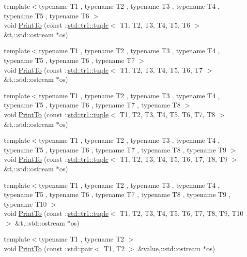 \begin{DoxyCompactItemize}
{\footnotesize template$<$typename T1 , typename T2 , typename T3 , typename T4 , typename T5 , typename T6 $>$ }\\void \hyperlink{namespacetesting_1_1internal_a205f62732d75b884f0668eb4483b2a58}{\-Print\-To} (const \-::\hyperlink{classstd_1_1tr1_1_1tuple}{std\-::tr1\-::tuple}$<$ \-T1, \-T2, \-T3, \-T4, \-T5, \-T6 $>$ \&t,\-::std\-::ostream $\ast$os)
\item 
{\footnotesize template$<$typename T1 , typename T2 , typename T3 , typename T4 , typename T5 , typename T6 , typename T7 $>$ }\\void \hyperlink{namespacetesting_1_1internal_aa3a910677d224678f1074520bc4f625f}{\-Print\-To} (const \-::\hyperlink{classstd_1_1tr1_1_1tuple}{std\-::tr1\-::tuple}$<$ \-T1, \-T2, \-T3, \-T4, \-T5, \-T6, \-T7 $>$ \&t,\-::std\-::ostream $\ast$os)
\item 
{\footnotesize template$<$typename T1 , typename T2 , typename T3 , typename T4 , typename T5 , typename T6 , typename T7 , typename T8 $>$ }\\void \hyperlink{namespacetesting_1_1internal_a0f47a6e3634be969039e1e6eb902934f}{\-Print\-To} (const \-::\hyperlink{classstd_1_1tr1_1_1tuple}{std\-::tr1\-::tuple}$<$ \-T1, \-T2, \-T3, \-T4, \-T5, \-T6, \-T7, \-T8 $>$ \&t,\-::std\-::ostream $\ast$os)
\item 
{\footnotesize template$<$typename T1 , typename T2 , typename T3 , typename T4 , typename T5 , typename T6 , typename T7 , typename T8 , typename T9 $>$ }\\void \hyperlink{namespacetesting_1_1internal_ad15d6fe963a626de83caee897c8221bc}{\-Print\-To} (const \-::\hyperlink{classstd_1_1tr1_1_1tuple}{std\-::tr1\-::tuple}$<$ \-T1, \-T2, \-T3, \-T4, \-T5, \-T6, \-T7, \-T8, \-T9 $>$ \&t,\-::std\-::ostream $\ast$os)
\item 
{\footnotesize template$<$typename T1 , typename T2 , typename T3 , typename T4 , typename T5 , typename T6 , typename T7 , typename T8 , typename T9 , typename T10 $>$ }\\void \hyperlink{namespacetesting_1_1internal_ab4c216410a9d9080b63f19a31a18c76a}{\-Print\-To} (const \-::\hyperlink{classstd_1_1tr1_1_1tuple}{std\-::tr1\-::tuple}$<$ \-T1, \-T2, \-T3, \-T4, \-T5, \-T6, \-T7, \-T8, \-T9, \-T10 $>$ \&t,\-::std\-::ostream $\ast$os)
\item 
{\footnotesize template$<$typename T1 , typename T2 $>$ }\\void \hyperlink{namespacetesting_1_1internal_a29508e1b1e55eb50775c69a8cdeb68c1}{\-Print\-To} (const \-::std\-::pair$<$ \-T1, \-T2 $>$ \&value,\-::std\-::ostream $\ast$os)

\end{DoxyCompactItemize}

